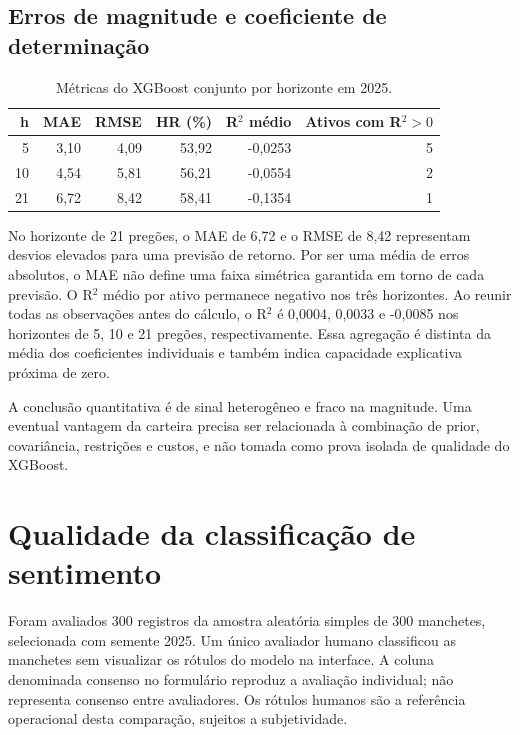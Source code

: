 \subsection*{Erros de magnitude e coeficiente de determinação}
\begin{table}[H]
\centering
\caption{Métricas do XGBoost conjunto por horizonte em 2025.}
\label{tab:metricas_pool_horizontes}
{\footnotesize
\begin{tabular}{@{}rrrrrr@{}}
\hline
h & MAE & RMSE & HR (\%) & R$^2$ médio & Ativos com R$^2>0$ \\ \hline
5 & 3,10 & 4,09 & 53,92 & -0,0253 & 5 \\
10 & 4,54 & 5,81 & 56,21 & -0,0554 & 2 \\
21 & 6,72 & 8,42 & 58,41 & -0,1354 & 1 \\
\hline
\end{tabular}}
\par{}
\end{table}
No horizonte de 21 pregões, o MAE de 6,72 e o RMSE de 8,42 representam desvios elevados para uma previsão de retorno. Por ser uma média de erros absolutos, o MAE não define uma faixa simétrica garantida em torno de cada previsão. O R$^2$ médio por ativo permanece negativo nos três horizontes. Ao reunir todas as observações antes do cálculo, o R$^2$ é 0,0004, 0,0033 e -0,0085 nos horizontes de 5, 10 e 21 pregões, respectivamente. Essa agregação é distinta da média dos coeficientes individuais e também indica capacidade explicativa próxima de zero.

A conclusão quantitativa é de sinal heterogêneo e fraco na magnitude. Uma eventual vantagem da carteira precisa ser relacionada à combinação de prior, covariância, restrições e custos, e não tomada como prova isolada de qualidade do XGBoost.

\section{Qualidade da classificação de sentimento}

Foram avaliados 300 registros da amostra aleatória simples de 300 manchetes, selecionada com semente 2025. Um único avaliador humano classificou as manchetes sem visualizar os rótulos do modelo na interface. A coluna denominada consenso no formulário reproduz a avaliação individual; não representa consenso entre avaliadores. Os rótulos humanos são a referência operacional desta comparação, sujeitos a subjetividade.

